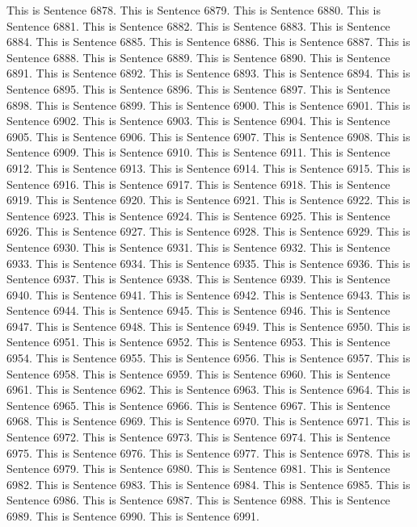 \documentclass{article}
\begin{document}
This is Sentence 6878.
This is Sentence 6879.
This is Sentence 6880.
This is Sentence 6881.
This is Sentence 6882.
This is Sentence 6883.
This is Sentence 6884.
This is Sentence 6885.
This is Sentence 6886.
This is Sentence 6887.
This is Sentence 6888.
This is Sentence 6889.
This is Sentence 6890.
This is Sentence 6891.
This is Sentence 6892.
This is Sentence 6893.
This is Sentence 6894.
This is Sentence 6895.
This is Sentence 6896.
This is Sentence 6897.
This is Sentence 6898.
This is Sentence 6899.
This is Sentence 6900.
This is Sentence 6901.
This is Sentence 6902.
This is Sentence 6903.
This is Sentence 6904.
This is Sentence 6905.
This is Sentence 6906.
This is Sentence 6907.
This is Sentence 6908.
This is Sentence 6909.
This is Sentence 6910.
This is Sentence 6911.
This is Sentence 6912.
This is Sentence 6913.
This is Sentence 6914.
This is Sentence 6915.
This is Sentence 6916.
This is Sentence 6917.
This is Sentence 6918.
This is Sentence 6919.
This is Sentence 6920.
This is Sentence 6921.
This is Sentence 6922.
This is Sentence 6923.
This is Sentence 6924.
This is Sentence 6925.
This is Sentence 6926.
This is Sentence 6927.
This is Sentence 6928.
This is Sentence 6929.
This is Sentence 6930.
This is Sentence 6931.
This is Sentence 6932.
This is Sentence 6933.
This is Sentence 6934.
This is Sentence 6935.
This is Sentence 6936.
This is Sentence 6937.
This is Sentence 6938.
This is Sentence 6939.
This is Sentence 6940.
This is Sentence 6941.
This is Sentence 6942.
This is Sentence 6943.
This is Sentence 6944.
This is Sentence 6945.
This is Sentence 6946.
This is Sentence 6947.
This is Sentence 6948.
This is Sentence 6949.
This is Sentence 6950.
This is Sentence 6951.
This is Sentence 6952.
This is Sentence 6953.
This is Sentence 6954.
This is Sentence 6955.
This is Sentence 6956.
This is Sentence 6957.
This is Sentence 6958.
This is Sentence 6959.
This is Sentence 6960.
This is Sentence 6961.
This is Sentence 6962.
This is Sentence 6963.
This is Sentence 6964.
This is Sentence 6965.
This is Sentence 6966.
This is Sentence 6967.
This is Sentence 6968.
This is Sentence 6969.
This is Sentence 6970.
This is Sentence 6971.
This is Sentence 6972.
This is Sentence 6973.
This is Sentence 6974.
This is Sentence 6975.
This is Sentence 6976.
This is Sentence 6977.
This is Sentence 6978.
This is Sentence 6979.
This is Sentence 6980.
This is Sentence 6981.
This is Sentence 6982.
This is Sentence 6983.
This is Sentence 6984.
This is Sentence 6985.
This is Sentence 6986.
This is Sentence 6987.
This is Sentence 6988.
This is Sentence 6989.
This is Sentence 6990.
This is Sentence 6991.
\end{document}

